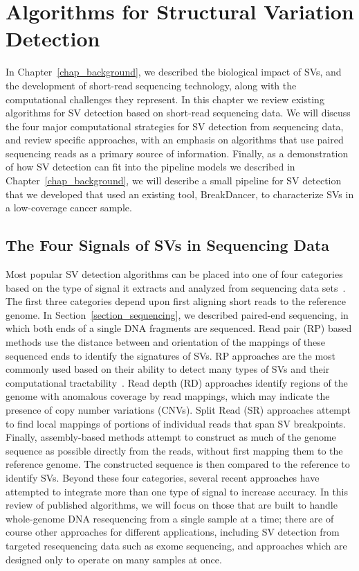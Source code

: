 \chapter{Algorithms for Structural Variation Detection}\label{chap_related_work}

In Chapter~\ref{chap_background}, we described the biological impact of SVs, and the development of short-read sequencing technology, along with the computational challenges they represent. In this chapter we review existing algorithms for SV detection based on short-read sequencing data. We will discuss the four major computational strategies for SV detection from sequencing data, and review specific approaches, with an emphasis on algorithms that use paired sequencing reads as a primary source of information. Finally, as a demonstration of how SV detection can fit into the pipeline models we described in Chapter~\ref{chap_background}, we will describe a small pipeline for SV detection that we developed that used an existing tool, BreakDancer, to characterize SVs in a low-coverage cancer sample. 

\section{The Four Signals of SVs in Sequencing Data}

Most popular SV detection algorithms can be placed into one of four categories based on the type of signal it extracts and analyzed from sequencing data sets~\cite{Alkan:2011p547,Koboldt:2012gj}. The first three categories depend upon first aligning short reads to the reference genome. In Section~\ref{section_sequencing}, we described paired-end sequencing, in which both ends of a single DNA fragments are sequenced. Read pair (RP) based methods use the distance between and orientation of the mappings of these sequenced ends to identify the signatures of SVs. RP approaches are the most commonly used based on their ability to detect many types of SVs and their computational tractability~\cite{Alkan:2011p547}. Read depth (RD) approaches identify regions of the genome with anomalous coverage by read mappings, which may indicate the presence of copy number variations (CNVs). Split Read (SR) approaches attempt to find local mappings of portions of individual reads that span SV breakpoints. Finally, assembly-based methods attempt to construct as much of the genome sequence as possible directly from the reads, without first mapping them to the reference genome. The constructed sequence is then compared to the reference to identify SVs. Beyond these four categories, several recent approaches have attempted to integrate more than one type of signal to increase accuracy. In this review of published algorithms, we will focus on those that are built to handle whole-genome DNA resequencing from a single sample at a time; there are of course other approaches for different applications, including SV detection from targeted resequencing data such as exome sequencing, and approaches which are designed only to operate on many samples at once.

